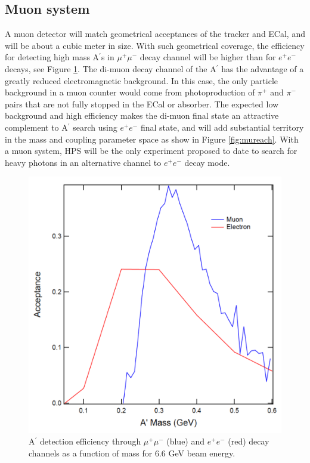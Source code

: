 \subsection{Muon system}

\label{sec:muon}


A muon detector will match geometrical acceptances of the tracker and ECal, and will be about a cubic meter in size. With such geometrical coverage, the efficiency for detecting high mass A$^\prime$s in $\mu^+\mu^-$ decay channel will be higher than for $e^+e^-$ decays, see Figure \ref{fig:muacc}. The di-muon decay channel of the A$^\prime$ has the advantage of a greatly reduced electromagnetic background.  In this case, the only particle background in a muon counter would come from photoproduction of $\pi^+$ and $\pi^-$ pairs that are not fully stopped in the ECal or absorber.  The expected low background and high efficiency makes the di-muon final state an attractive complement to A$^\prime$ search using $e^+e^-$ final state, and will add substantial territory in the mass and coupling parameter space as show in Figure \ref{fig:mureach}. With a muon system, HPS will be the only experiment proposed to date to search for heavy photons in an alternative channel to $e^+e^-$ decay mode.

\begin{figure}[!ht]
\includegraphics[scale=0.4]{muon/acc.pdf}
\caption{\small{A$^\prime$ detection efficiency through $\mu^+\mu^-$ (blue) and $e^+e^-$ (red) decay channels as a function of mass for 6.6 GeV beam energy.}}\label{fig:muacc}
\end{figure}

